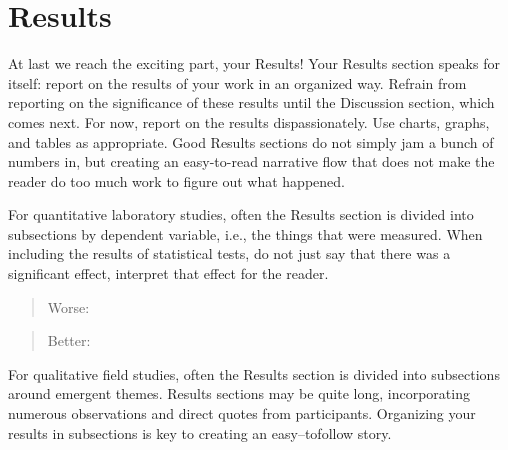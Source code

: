 \section{Results}
At last we reach the exciting part, your Results! 
Your Results section speaks for itself: report on the results of your work in an organized way. 
Refrain from reporting on the significance of these results until the Discussion section, which comes next. 
For now, report on the results dispassionately. 
Use charts, graphs, and tables as appropriate. 
Good Results sections do not simply jam a bunch of numbers in, but  creating an easy-to-read narrative flow that does not make the reader do too much work to figure out what happened.

For quantitative laboratory studies, often the Results section is divided into subsections by dependent variable, i.e., the things that were measured. 
When including the results of statistical tests, do not just say that there was a significant effect, interpret that effect for the reader. 
\begin{quote}
    Worse:  
\end{quote}
\begin{quote}
    Better: 
\end{quote}

For qualitative field studies, often the Results section is divided into subsections around emergent themes. 
Results sections may be quite long, incorporating numerous observations and direct quotes from participants. 
Organizing your results in subsections is key to creating an easy--tofollow story.